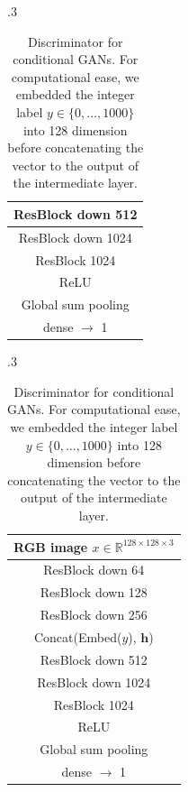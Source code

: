 \documentclass{article}
\newcommand{\bbR}{\mathbb{R}}
\newcommand{\bmh}{{\bm h}}
\begin{document}
\begin{table}[ht]
\begin{subtable}{.3\textwidth}
{\begin{tabular}{c}
                  \midrule
                  ResBlock down 512\\
                  \midrule
                  ResBlock down 1024\\
                  \midrule
                  ResBlock 1024\\
                  \midrule
                  ReLU\\
                  \midrule
                  Global sum pooling\\
                  \midrule
                  dense $\rightarrow$ 1 \\
                  \midrule
                  \bottomrule
              \end{tabular}}
              \caption{\label{tab:dis_resnet_imagenet_unsup} Discriminator for unconditional GANs.}
          \end{subtable}\hspace{5mm}
          \begin{subtable}{.3\textwidth}
              \centering
              {\begin{tabular}{c}
                  \toprule
                  \midrule
                  RGB image $x\in \bbR^{128\times 128 \times 3}$ \\
                  \midrule
                  ResBlock down 64\\
                  \midrule
                  ResBlock down 128\\
                  \midrule
                  ResBlock down 256\\
                  \midrule
                  Concat(Embed($y$), $\bmh$)\\
                  \midrule
                  ResBlock down 512\\
                  \midrule
                  ResBlock down 1024\\
                  \midrule
                  ResBlock 1024\\
                  \midrule
                  ReLU\\
                  \midrule
                  Global sum pooling\\
                  \midrule
                  dense $\rightarrow$ 1 \\
                  \midrule
                  \bottomrule
              \end{tabular}}
              \caption{\label{tab:dis_resnet_imagenet} Discriminator for conditional GANs.
              For computational ease, we embedded the integer label $y\in\{0, \dots,1000\}$ into 128 dimension before concatenating the vector to the output of the intermediate layer.}
          \end{subtable}
\end{table}
\end{document}
